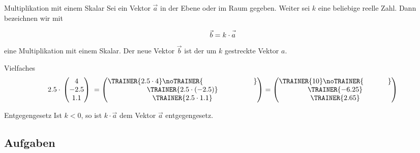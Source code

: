 \begin{definition}{Multiplikation mit einem Skalar}{}
  Sei ein Vektor $\vec{a}$ in der Ebene oder im Raum gegeben. Weiter
  sei $k$ eine beliebige reelle Zahl. Dann bezeichnen wir mit
  
  $$\vec{b} = k \cdot{} \vec{\vphantom{b}a}$$
  eine Multiplikation mit einem Skalar. Der neue Vektor $\vec{b}$ ist
  der um $k$ gestreckte Vektor $a$.
\end{definition}

\begin{beispiel}{Vielfaches}{}
  $$2.5\cdot{} \begin{pmatrix} 4 \\ -2.5 \\ 1.1 \end{pmatrix} \;
  = \begin{pmatrix}\TRAINER{2.5\cdot{} 4}\noTRAINER{\hspace{25mm}}  \\ \TRAINER{2.5\cdot{} (-2.5)} \\ \TRAINER{2.5\cdot{} 1.1} \end{pmatrix}
  = \begin{pmatrix}\TRAINER{10}\noTRAINER{\hspace{12mm}} \\ \TRAINER{-6.25} \\ \TRAINER{2.65} \end{pmatrix}$$
\end{beispiel}

\begin{bemerkung}{Entgegengesetz}{}
  Ist $k<0$, so ist $k\cdot{}\vec{a}$ dem Vektor $\vec{a}$ entgegengesetz.
\end{bemerkung}


\subsection*{Aufgaben}
